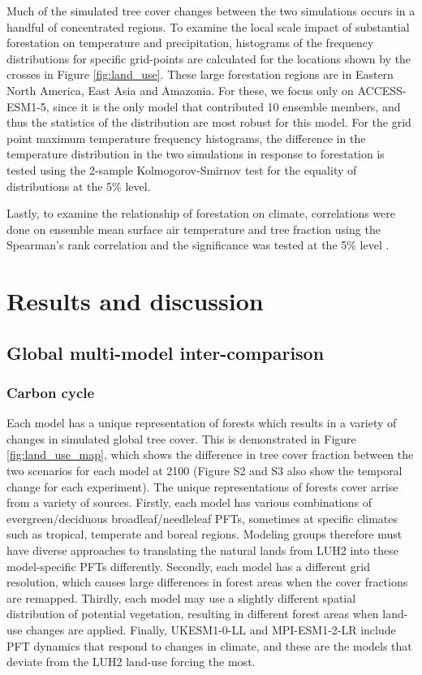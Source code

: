\documentclass[draft]{agujournal2019}
\begin{document}
Much of the simulated tree cover changes between the two simulations occurs in a handful of concentrated regions.
To examine the local scale impact of substantial forestation on temperature and precipitation, histograms of the frequency distributions for specific grid-points are calculated for the locations shown by the crosses in Figure \ref{fig:land_use}.
These large forestation regions are in Eastern North America, East Asia and Amazonia.
For these, we focus only on ACCESS-ESM1-5, since it is the only model that contributed 10 ensemble members, and thus the statistics of the distribution are most robust for this model.
For the grid point maximum temperature frequency histograms, the difference in the temperature distribution in the two simulations in response to forestation is tested using the 2-sample Kolmogorov-Smirnov test for the equality of distributions at the 5\% level.

Lastly, to examine the relationship of forestation on climate, correlations were done on ensemble mean surface air temperature and tree fraction using the Spearman's rank correlation and the significance was tested at the 5\% level \cite{kokoska2000crc}.

\section{Results and discussion}

\subsection{Global multi-model inter-comparison}

\subsubsection{Carbon cycle}

Each model has a unique representation of forests which results in a variety of changes in simulated global tree cover.
This is demonstrated in Figure \ref{fig:land_use_map}, which shows the difference in tree cover fraction between the two scenarios for each model at 2100 (Figure S2 and S3 also show the temporal change for each experiment).
The unique representations of forests cover arrise from a variety of sources.
Firstly, each model has various combinations of evergreen/deciduous broadleaf/needleleaf PFTs, sometimes at specific climates such as tropical, temperate and boreal regions.
Modeling groups therefore must have diverse approaches to translating the natural lands from LUH2 into these model-specific PFTs differently.
Secondly, each model has a different grid resolution, which causes large differences in forest areas when the cover fractions are remapped.
Thirdly, each model may use a slightly different spatial distribution of potential vegetation, resulting in different forest areas when land-use changes are applied.
Finally, UKESM1-0-LL and MPI-ESM1-2-LR include PFT dynamics that respond to changes in climate, and these are the models that deviate from the LUH2 land-use forcing the most.
\end{document}
